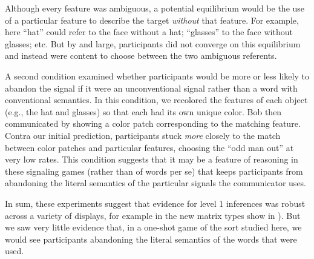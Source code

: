 \noindent Although every feature was ambiguous, a potential equilibrium would be the use of a particular feature to describe the target \emph{without} that feature. For example, here ``hat'' could refer to the face without a hat; ``glasses'' to the face without glasses; etc. But by and large, participants did not converge on this equilibrium and instead were content to choose between the two ambiguous referents. 

A second condition examined whether participants would be more or less likely to abandon the signal if it were an unconventional signal rather than a word with conventional semantics. In this condition, we recolored the features of each object (e.g., the hat and glasses) so that each had its own unique color. Bob then communicated by showing a color patch corresponding to the matching feature. Contra our initial prediction, participants stuck \emph{more} closely to the match between color patches and particular features, choosing the ``odd man out'' at very low rates. This condition suggests that it may be a feature of reasoning in these signaling games (rather than of words per se) that keeps participants from abandoning the literal semantics of the particular signals the communicator uses.

In sum, these experiments suggest that evidence for level 1 inferences was robust across a variety of displays, for example in the new matrix types show in ). But we saw very little evidence that, in a one-shot game of the sort studied here, we would see participants abandoning the literal semantics of the words that were used. 

